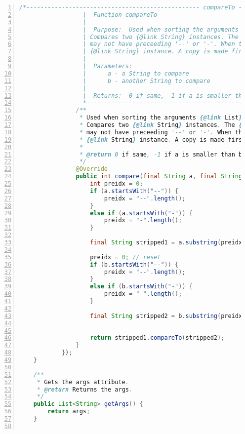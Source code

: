 \documentclass[11pt,notitlepage]{article}
\begin{document}
\begin{lstlisting}[numbers=left,language=java,basicstyle=\scriptsize,backgroundcolor=\color{ubergray},caption={trnapp-config.xml},frame=single,breaklines=true]
                /*------------------------------------------------- compareTo -----
                  |  Function compareTo
                  |
                  |  Purpose:  Used when sorting the arguments {@link List} instance.
                  | Compares two {@link String} instances. The {@link String} instances may or 
                  | may not have preceeding '--' or '-'. When they do, these are stripped from the 
                  | {@link String} instance. A copy is made first, so the original is not effected.
                  |
                  |  Parameters:
                  |      a - a String to compare
                  |      b - another String to compare
                  |
                  |  Returns:  0 if same, -1 if a is smaller than b, and 1 if a is larger than b
                  *-------------------------------------------------------------------*/
                /**
                 * Used when sorting the arguments {@link List} instance.
                 * Compares two {@link String} instances. The {@link String} instances may or 
                 * may not have preceeding '--' or '-'. When they do, these are stripped from the 
                 * {@link String} instance. A copy is made first, so the original is not effected.
                 *
                 * @return 0 if same, -1 if a is smaller than b, and 1 if a is larger than b
                 */
                @Override
                public int compare(final String a, final String b) {
                    int preidx = 0;
                    if (a.startsWith("--")) {
                        preidx = "--".length();
                    }
                    else if (a.startsWith("-")) {
                        preidx = "-".length();
                    }

                    final String stripped1 = a.substring(preidx);
                    
                    preidx = 0; // reset
                    if (b.startsWith("--")) {
                        preidx = "--".length();
                    }
                    else if (b.startsWith("-")) {
                        preidx = "-".length();
                    }

                    final String stripped2 = b.substring(preidx);
                    

                    return stripped1.compareTo(stripped2);
                }
            });
    }

    /**
     * Gets the args attribute. 
     * @return Returns the args.
     */
    public List<String> getArgs() {
        return args;
    }


\end{lstlisting}
\end{document}

